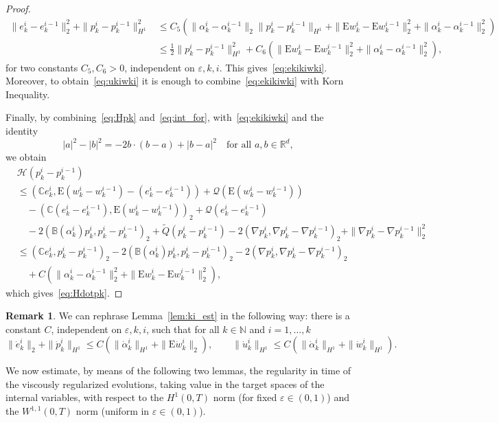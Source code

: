 \documentclass[reqno]{amsart}
\theoremstyle{definition}
\newtheorem{remark}[corollary]{Remark}
\numberwithin{equation}{section}
\def\R {\mathbb R}
\def\N {\mathbb N}
\def\C {\mathbb C}
\def\EE {\mathrm{E}}
\begin{document}
\begin{proof}
\begin{align*}
\|e_k^i-e_k^{i-1}\|_2^2+\|p_k^i-p_k^{i-1}\|_{H^1}^2&\le C_5(\|\alpha_k^i-\alpha_k^{i-1}\|_2\|p_k^i-p_k^{i-1}\|_{H^1}+\|\EE w_k^i-\EE w_k^{i-1}\|_2^2+\|\alpha_k^i-\alpha_k^{i-1}\|_2^2)\\
&\le \frac{1}{2}\|p_k^i-p_k^{i-1}\|_{H^1}^2+C_6(\|\EE w_k^i-\EE w_k^{i-1}\|_2^2+\|\alpha_k^i-\alpha_k^{i-1}\|_2^2),
\end{align*}
for two constants $C_5,C_6>0$, independent on $\varepsilon,k,i$. This gives~\eqref{eq:ekikiwki}. Moreover, to obtain~\eqref{eq:ukiwki} it is enough to combine~\eqref{eq:ekikiwki} with Korn Inequality. 

Finally, by combining~\eqref{eq:Hpk} and~\eqref{eq:int_for}, with~\eqref{eq:ekikiwki} and the identity
$$|a|^2-|b|^2=-2b\cdot(b-a)+|b-a|^2\quad\text{for all $a,b\in\R^d$},$$
we obtain
\begin{align*}
&\mathcal H(p_k^i-p_k^{i-1})\\
&\le (\C e_k^i,\EE(w_k^i-w_k^{i-1})-(e_k^i-e_k^{i-1}))+\mathcal Q(\EE(w_k^i-w_k^{i-1}))\\
&\quad-(\C (e_k^i-e_k^{i-1}),\EE(w_k^i-w_k^{i-1}))_2+\mathcal Q(e_k^i-e_k^{i-1})\\
&\quad -2(\mathbb B(\alpha_k^i)p_k^i,p_k^i-p_k^{i-1})_2+\tilde Q(p_k^i-p_k^{i-1})-2(\nabla p_k^i,\nabla p_k^i-\nabla p_k^{i-1})_2+\|\nabla p_k^i-\nabla p_k^{i-1}\|_2^2\\
&\le (\C e_k^i,p_k^i-p_k^{i-1})_2-2(\mathbb B(\alpha_k^i)p_k^i,p_k^i-p_k^{i-1})_2-2(\nabla p_k^i,\nabla p_k^i-\nabla p_k^{i-1})_2\\
&\quad+C\left(\|\alpha_k^i-\alpha_k^{i-1}\|_2^2+\|\EE w_k^i-\EE w_k^{i-1}\|_2^2\right),
\end{align*}
which gives~\eqref{eq:Hdotpk}.
\end{proof}

\begin{remark}
We can rephrase Lemma~\ref{lem:ki_est} in the following way: there is a constant $C$, independent on $\varepsilon,k,i$, such that for all $k\in\N$ and $i=1,\dots,k$ 
\begin{equation*}\|\dot e_k^i\|_2+\|\dot p_k^i\|_{H^1}\le C(\|\dot \alpha_k^i\|_{H^1}+\|\EE \dot w_k^i\|_2),\qquad \|\dot u_k^i\|_{H^1}\le C(\|\dot \alpha_k^i\|_{H^1}+\|\dot w_k^i\|_{H^1}).
\end{equation*}
\end{remark}

We now estimate, by means of the following two lemmas, the regularity in time of the viscously regularized evolutions, taking value in the target spaces of the internal variables, with respect to the $H^1(0,T)$ norm (for fixed $\varepsilon\in(0,1)$) and the $W^{1,1}(0,T)$ norm (uniform in $\varepsilon\in(0,1)$).
\end{document}
